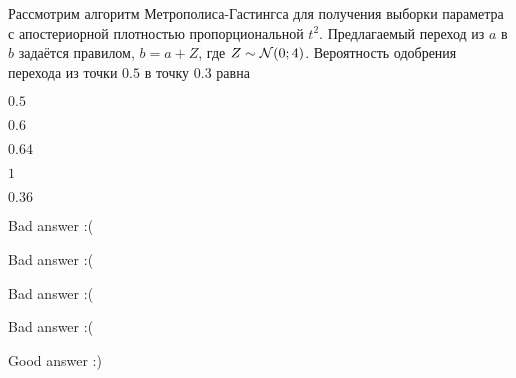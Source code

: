 
\begin{question}
Рассмотрим алгоритм Метрополиса-Гастингса для получения выборки
параметра с апостериорной плотностью пропорциональной \(t^2\).
Предлагаемый переход из \(a\) в \(b\) задаётся правилом, \(b = a + Z\),
где \(Z \sim \mathcal{N}(0;4)\). Вероятность одобрения перехода из точки \(0.5\)
в точку \(0.3\) равна
\begin{answerlist}
  \item \(0.5\)
  \item \(0.6\)
  \item \(0.64\)
  \item \(1\)
  \item \(0.36\)
\end{answerlist}
\end{question}

\begin{solution}
\begin{answerlist}
  \item Bad answer :(
  \item Bad answer :(
  \item Bad answer :(
  \item Bad answer :(
  \item Good answer :)
\end{answerlist}
\end{solution}

